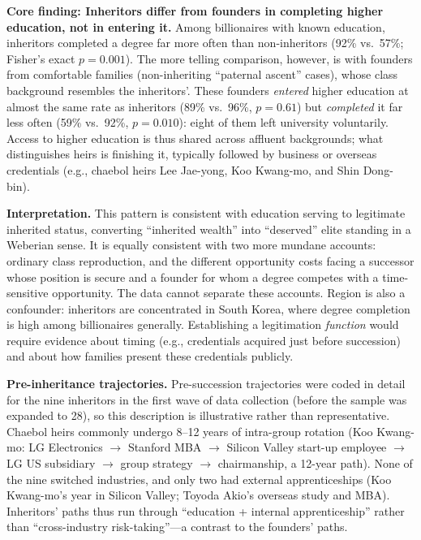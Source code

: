 \documentclass[11pt,a4paper]{article}
\begin{document}
\textbf{Core finding: Inheritors differ from founders in completing higher education, not in entering it.} Among billionaires with known education, inheritors completed a degree far more often than non-inheritors (92\% vs.\ 57\%; Fisher's exact $p=0.001$). The more telling comparison, however, is with founders from comfortable families (non-inheriting ``paternal ascent'' cases), whose class background resembles the inheritors'. These founders \emph{entered} higher education at almost the same rate as inheritors (89\% vs.\ 96\%, $p=0.61$) but \emph{completed} it far less often (59\% vs.\ 92\%, $p=0.010$): eight of them left university voluntarily. Access to higher education is thus shared across affluent backgrounds; what distinguishes heirs is finishing it, typically followed by business or overseas credentials (e.g., chaebol heirs Lee Jae-yong, Koo Kwang-mo, and Shin Dong-bin).

\textbf{Interpretation.} This pattern is consistent with education serving to legitimate inherited status, converting ``inherited wealth'' into ``deserved'' elite standing in a Weberian sense. It is equally consistent with two more mundane accounts: ordinary class reproduction, and the different opportunity costs facing a successor whose position is secure and a founder for whom a degree competes with a time-sensitive opportunity. The data cannot separate these accounts. Region is also a confounder: inheritors are concentrated in South Korea, where degree completion is high among billionaires generally. Establishing a legitimation \emph{function} would require evidence about timing (e.g., credentials acquired just before succession) and about how families present these credentials publicly.

\textbf{Pre-inheritance trajectories.} Pre-succession trajectories were coded in detail for the nine inheritors in the first wave of data collection (before the sample was expanded to 28), so this description is illustrative rather than representative. Chaebol heirs commonly undergo 8--12 years of intra-group rotation (Koo Kwang-mo: LG Electronics $\rightarrow$ Stanford MBA $\rightarrow$ Silicon Valley start-up employee $\rightarrow$ LG US subsidiary $\rightarrow$ group strategy $\rightarrow$ chairmanship, a 12-year path). None of the nine switched industries, and only two had external apprenticeships (Koo Kwang-mo's year in Silicon Valley; Toyoda Akio's overseas study and MBA). Inheritors' paths thus run through ``education + internal apprenticeship'' rather than ``cross-industry risk-taking''---a contrast to the founders' paths.
\end{document}
